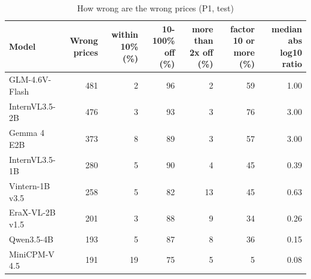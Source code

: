 \begin{table}[t]
\centering
\caption{How wrong are the wrong prices (P1, test)}
\label{tab:severity}
\small
\begin{tabular}{lrrrrrr}
\toprule
Model & Wrong prices & within 10\% (\%) & 10-100\% off (\%) & more than 2x off (\%) & factor 10 or more (\%) & median abs log10 ratio \\
\midrule
GLM-4.6V-Flash & 481 & 2 & 96 & 2 & 59 & 1.00 \\
InternVL3.5-2B & 476 & 3 & 93 & 3 & 76 & 3.00 \\
Gemma 4 E2B & 373 & 8 & 89 & 3 & 57 & 3.00 \\
InternVL3.5-1B & 280 & 5 & 90 & 4 & 45 & 0.39 \\
Vintern-1B v3.5 & 258 & 5 & 82 & 13 & 45 & 0.63 \\
EraX-VL-2B v1.5 & 201 & 3 & 88 & 9 & 34 & 0.26 \\
Qwen3.5-4B & 193 & 5 & 87 & 8 & 36 & 0.15 \\
MiniCPM-V 4.5 & 191 & 19 & 75 & 5 & 5 & 0.08 \\
\bottomrule
\end{tabular}
\par{}
\end{table}
